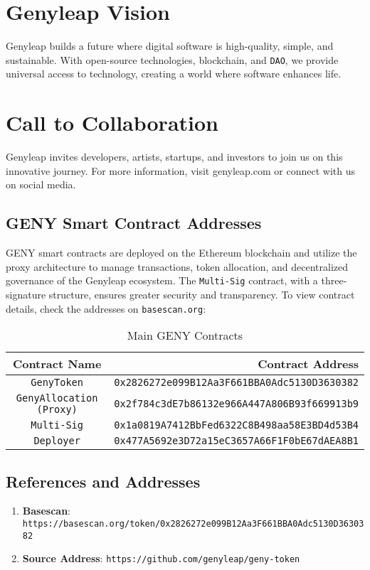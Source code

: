 \documentclass[a4paper,12pt,openany]{book}
\begin{document}
\chapter{Genyleap Vision}
Genyleap builds a future where digital software is high-quality, simple, and sustainable. With open-source technologies, blockchain, and \texttt{DAO}, we provide universal access to technology, creating a world where software enhances life.

\chapter{Call to Collaboration}
Genyleap invites developers, artists, startups, and investors to join us on this innovative journey. For more information, visit genyleap.com or connect with us on social media.

\section*{GENY Smart Contract Addresses}
GENY smart contracts are deployed on the Ethereum blockchain and utilize the  proxy architecture to manage transactions, token allocation, and decentralized governance of the Genyleap ecosystem. The \texttt{Multi-Sig} contract, with a three-signature structure, ensures greater security and transparency. To view contract details, check the addresses on \texttt{basescan.org}:

\begin{table}[h]
\centering
\caption*{Main GENY Contracts}
\small
\begin{tabular}{c r}
\hline
\textbf{Contract Name} & \textbf{Contract Address} \\
\hline
\texttt{GenyToken} & {\texttt{0x2826272e099B12Aa3F661BBA0Adc5130D3630382}} \\
\texttt{GenyAllocation (Proxy)} & {\texttt{0x2f784c3dE7b86132e966A447A806B93f669913b9}} \\
\texttt{Multi-Sig} & {\texttt{0x1a0819A7412BbFed6322C8B498aa58E3BD4d53B4}} \\
\texttt{Deployer} & {\texttt{0x477A5692e3D72a15eC3657A66F1F0bE67dAEA8B1}} \\
\hline
\end{tabular}
\end{table}

\section*{References and Addresses}

\begin{enumerate}
    \item \textbf{Basescan}: \texttt{https://basescan.org/token/0x2826272e099B12Aa3F661BBA0Adc5130D3630382}
    \item \textbf{Source Address}: \texttt{https://github.com/genyleap/geny-token}
\end{enumerate}
\end{document}
